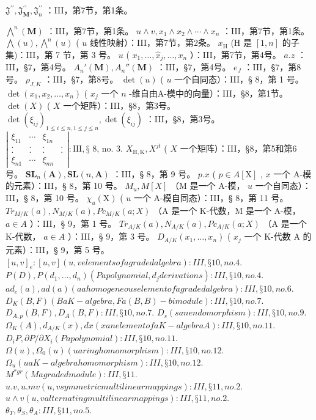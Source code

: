 \(\mathfrak{J}^{\prime \prime},\mathfrak{J}_{\mathbf{M}}^{\prime \prime},\mathfrak{J}_{n}^{\prime \prime}\) ：III，第7节，第1条。

\(\bigwedge^{n}(\mathbf{M})\) ：III，第7节，第1条。 \(u \wedge v, x_{1} \wedge x_{2} \wedge \cdots \wedge x_{n}\) ：III，第7节，第1条。 \(\bigwedge(u), \bigwedge^{n}(u)\) ( \(u\) 线性映射）：III，第7节，第2条。 \(x_{\mathrm{H}}\) (H 是 \([1, n]\) 的子集)：III，第 7 节，第 3 号。 \(u\) ( \(x_{1}, \ldots, \hat{x}_{j}, \ldots, x_{n}\) ）：III，第7节，第4号。 \(a.z\) ：III，§7，第4号。 \(A_{n}'(\mathbf{M}), A_{n}''(\mathbf{M})\) ：III，§7，第4号。 \(e_{J}\) ：III，§7，第8号。 \(\rho_{J,K}\) ：III，§7，第8号。 \(\det(u)\) ( \(u\) 一个自同态）：III，§ 8，第 1 号。 \(\det(x_{1}, x_{2}, \ldots, x_{n})\) ( \(x_{j}\) 一个 \(n\) -维自由A-模中的向量）：III，§8，第1节。 \(\det(X)\) ( \(X\) 一个矩阵）：III，§8，第3号。 \(\det(\xi_{ij})_{1 \leq i \leq n, 1 \leq j \leq n}, \det(\xi_{ij})\) ：III，§8，第3号。 \(\left| \begin{array}{cccc}\xi_{11} & \cdots & \xi_{1n} \\ . & . & . & . \\ . & . & . & . \\ \xi_{n1} & \cdots & \xi_{nn} \end{array} \right|: \text{III}, \text{§ 8, no. 3.}\) \(X_{\mathrm{H,K}}, X^{jt}\) ( \(X\) 一个矩阵）：III，§8，第5和第6号。 \(\mathbf{SL}_{n}(\mathbf{A}), \mathbf{SL}(n, \mathbf{A})\) ：III，§ 8，第 9 号。 \(p.x\) ( \(p \in A[\mathrm{X}]\) , \(x\) 一个 A-模的元素）：III，§ 8，第 10 号。 \(M_{u}, M[X]\) （M 是一个 A-模， \(u\) 一个自同态）：III，§ 8，第 10 号。 \(\chi_{u}(\mathrm{X})\) ( \(u\) 一个 A-模自同态）：III，§ 8，第 11 号。 \(Tr_{M/K}(a), N_{M/K}(a), Pc_{M/K}(a; X)\) （A 是一个 K-代数，M 是一个 A-模， \(a \in A\) ）：III，§ 9，第 1 号。 \(Tr_{A/K}(a), N_{A/K}(a), Pc_{A/K}(a; X)\) （A 是一个 K-代数， \(a \in A\) ）：III，§ 9，第 3 号。 \(D_{A/K}(x_{1}, \ldots, x_{n})\) ( \(x_{j}\) 一个 K-代数 A 的元素）：III，§ 9，第 5 号。 \([u,v]_{e}: [u,v] (u,v elements of a graded algebra) : III, § 10, no. 4.\) \(P(D), P(d_{1}, \ldots, d_{n}) (P a polynomial, d_{j} derivations) : III, § 10, no. 4.\) \(ad_{e}(a), ad(a) (a a homogeneous element of a graded algebra) : III, § 10, no. 6.\) \(D_{K}(B,F) (B a K-algebra, F a (B,B)-bimodule) : III, § 10, no. 7.\) \(D_{A,p}(B,F), D_{A}(B,F) : III, § 10, no. 7.\) \(D_{s} (s an endomorphism) : III, § 10, no. 9.\) \(\Omega_{K}(A), d_{A/K}(x), dx (x an element of a K-algebra A) : III, § 10, no. 11.\) \(D_{i}P, ∂P/∂X_{i} (P a polynomial) : III, § 10, no. 11.\) \(Ω(u), Ω_{0}(u) (u a ring homomorphism) : III, § 10, no. 12.\) \(Ω_{u} (u a K-algebra homomorphism) : III, § 10, no. 12.\) \(M^{*gr} (M a graded module) : III, § 11.\) \(u.v, u.mv (u,v symmetric multilinear mappings) : III, § 11, no. 2.\) \(u \wedge v (u,v alternating multilinear mappings) : III, § 11, no. 2.\) \(θ_{T}, θ_{S}, θ_{A} : III, § 11, no. 5.\)

